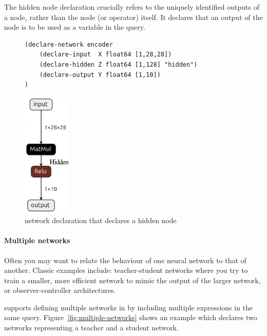 The hidden node declaration crucially refers to the uniquely identified outputs of a node, rather than the node (or operator) itself. It declares that an output of the node is to be used as a variable in the \vnnlib{} query.

\begin{figure}[h!]
    \begin{minipage}[c]{0.76\textwidth}
        \begin{lstlisting}[style=lbnf]   
(declare-network encoder
    (declare-input  X float64 [1,28,28])
    (declare-hidden Z float64 [1,128] "hidden")
    (declare-output Y float64 [1,10])
)\end{lstlisting}
    \end{minipage}%
    \begin{minipage}[c]{0.21\textwidth}
        \centering
        \includegraphics[height=6cm]{imgs/encoder_net.onnx.png}
    \end{minipage}
    \caption{\vnnlib{} network declaration that declares a hidden node}
    \label{fig:hidden-node}
\end{figure}

\paragraph{Multiple networks}

Often you may want to relate the behaviour of one neural network to that of another. Classic examples include: teacher-student networks where you try to train a smaller, more efficient network to mimic the output of the larger network, or observer-controller architectures.

\vnnlib{} supports defining multiple networks in by including multiple  expressions in the same query. Figure~\ref{fig:multiple-networks} 
shows an example which declares two networks representing a teacher and a student network.

